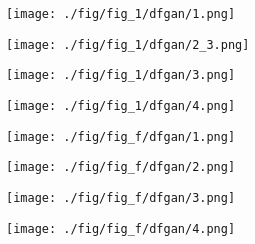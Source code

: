 \documentclass{article}
\begin{document}
\begin{figure*}[t!h]
		\begin{minipage}[c]{0.01\textwidth}
		\end{minipage}
		\hfill
		\begin{minipage}{0.115\textwidth}
			\texttt{[image: ./fig/fig\_1/dfgan/1.png]}
		\end{minipage}
		\hfill
		\begin{minipage}{0.115\textwidth}
			\texttt{[image: ./fig/fig\_1/dfgan/2\_3.png]}
		\end{minipage}
		\hfill
		\begin{minipage}{0.115\textwidth}
			\texttt{[image: ./fig/fig\_1/dfgan/3.png]}
		\end{minipage}
		\hfill
		\begin{minipage}{0.115\textwidth}
			\texttt{[image: ./fig/fig\_1/dfgan/4.png]}
		\end{minipage}
\hspace{1pt}
		\begin{minipage}{0.115\textwidth}
			\texttt{[image: ./fig/fig\_f/dfgan/1.png]}
		\end{minipage}
		\hfill
		\begin{minipage}{0.115\textwidth}
			\texttt{[image: ./fig/fig\_f/dfgan/2.png]}
		\end{minipage}
		\hfill
		\begin{minipage}{0.115\textwidth}
			\texttt{[image: ./fig/fig\_f/dfgan/3.png]}
		\end{minipage}
		\hfill
		\begin{minipage}{0.115\textwidth}
			\texttt{[image: ./fig/fig\_f/dfgan/4.png]}
		\end{minipage}
		\vspace{2pt}
		

\end{figure*}
\end{document}
